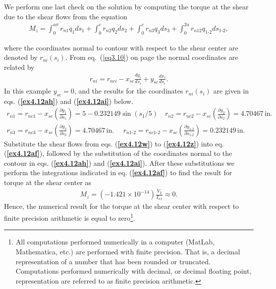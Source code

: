 \documentclass{AeroStructure-ERJohnson}
\begin{document}
\begin{example}
We perform one last check on the solution by computing the torque at the shear due to the shear flows from the equation
\begin{align}\label{ex4.12af}
M_{z}=\int_{0}^{a \pi} r_{n 1} q_{1} d s_{1}+\int_{0}^{c} r_{n 2} q_{2} d s_{2}+\int_{0}^{c} r_{n 3} q_{3} d s_{3}+\int_{0}^{2a} r_{n 12} q_{\textrm{1-2}} d s_{\textrm{1-2}},\tag{af}
\end{align}
\vspace*{5pt}
\clearpage

\noindent where the coordinates normal to contour with respect to the shear center are denoted by $r_{n i}\left(s_{i}\right)$. From eq.~(\ref{eq3.10}) on page \pageref{eq3.10} the normal coordinates are related by
\begin{align}\label{ex4.12ag}
r_{n i}=r_{n c i}-x_{s c} \frac{d y_{i}}{d s_{i}}+y_{s c} \frac{d x_{i}}{d s_{i}}.\tag{ag}
\end{align}
In this example $y_{s c}=0$, and the results for the coordinates $r_{n i}\left(s_{i}\right)$ are given in eqs. (\textbf{\ref{ex4.12ah}}) and (\textbf{\ref{ex4.12ai}}) below.
\begin{gather}
r_{n 1}=r_{n c 1}-x_{s c}\left(\frac{\partial y_{1}}{\partial s_{1}}\right)=5-0.232149 \sin \left(s_{1}/5\right) \quad r_{n 2}=r_{n c 2}-x_{s c}\left(\frac{\partial y_{2}}{\partial s_{2}}\right)=4.70467\,\textrm{in}.
\label{ex4.12ah}\tag{ah}\\
r_{n 3}=r_{n c 3}-x_{s c}\left(\frac{\partial y_{3}}{\partial s_{3}}\right)=4.70467\,\textrm{in. } \quad r_{n 1\mbox{-}2}=r_{n c 1\mbox{-}2}-x_{s c}\left(\frac{\partial y_{\textrm{1-2}}}{\partial s_{\textrm{1-2}}}\right)=0.232149\,\textrm{in}.\label{ex4.12ai}\tag{ai}
\end{gather}
Substitute the shear flows from eqs. (\textbf{\ref{ex4.12w}}) to (\textbf{\ref{ex4.12z}}) into eq. (\textbf{\ref{ex4.12af}}), followed by the substitution of the coordinates normal to the contour in eqs. (\textbf{\ref{ex4.12ah}}) and (\textbf{\ref{ex4.12ai}}). After these substitutions we perform the integrations indicated in eq. (\textbf{\ref{ex4.12af}}) to find the result for torque at the shear center as
\begin{align}\label{ex4.12aj}\tag{aj}
M_{z}=\left(-1.421 \times 10^{-14}\right) \frac{V_{y}}{I_{x x}} \approx 0.
\end{align}
Hence, the numerical result for the torque at the shear center with respect to finite precision arithmetic is equal to zero\footnote{All computations performed numerically in a computer (MatLab, Mathematica, etc.) are performed with finite precision. That is, a decimal representation of a number that has been rounded or truncated. Computations performed numerically with decimal, or decimal floating point, representation are referred to as finite precision arithmetic.}.
\end{example}
\end{document}
